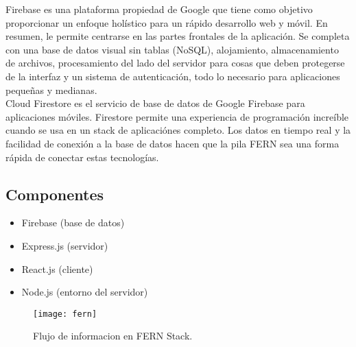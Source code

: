Firebase es una plataforma propiedad de Google que tiene como objetivo proporcionar un enfoque holístico para un rápido desarrollo web y móvil. En resumen, le permite centrarse en las partes frontales de la aplicación. Se completa con una base de datos visual sin tablas (NoSQL), alojamiento, almacenamiento de archivos, procesamiento del lado del servidor para cosas que deben protegerse de la interfaz y un sistema de autenticación, todo lo necesario para aplicaciones pequeñas y medianas. \\[0.8cm]
Cloud Firestore es el servicio de base de datos de Google Firebase para aplicaciones móviles. Firestore permite una experiencia de programación increíble cuando se usa en un stack de aplicaciónes completo. Los datos en tiempo real y la facilidad de conexión a la base de datos hacen que la pila FERN sea una forma rápida de conectar estas tecnologías. 
\subsection{Componentes}
\begin{itemize}
  \item Firebase (base de datos)
  \item Express.js (servidor)
  \item React.js (cliente)
  \item Node.js (entorno del servidor)
\end{itemize}
\begin{figure}[H]
  \centering
  \texttt{[image: fern]}
  \caption{Flujo de informacion en FERN Stack.}
\end{figure}
